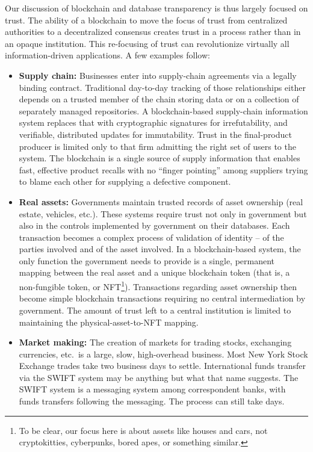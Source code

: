 \documentclass[11pt,dvipdfm]{article}
\begin{document}
Our discussion of blockchain and database transparency is thus largely focused on trust.
The ability of a blockchain to move the focus of trust from centralized authorities to a decentralized
consensus creates trust in a process rather than in an opaque institution.
This re-focusing of trust can revolutionize virtually all information-driven applications.
A few examples follow:
\begin{itemize}
\item {\bf Supply chain: } Businesses enter into supply-chain agreements via a legally binding
contract.  Traditional day-to-day tracking of those relationships either depends on a trusted member of the
chain storing data or on a collection of separately managed  repositories.  A blockchain-based supply-chain
information system replaces that with cryptographic signatures\cite{dh76} for irrefutability,  and verifiable, distributed updates for immutability.
Trust in the final-product producer is limited only to that firm admitting the right set of users to the system.
The blockchain is a single source of supply information that enables fast, effective product recalls with no ``finger pointing'' among
suppliers trying to blame each other for supplying a defective component.
\item {\bf Real assets: } Governments maintain trusted records of asset ownership (real estate, vehicles, etc.).
These systems require trust not only in government but also in the controls implemented by government on
their databases.  Each transaction becomes a complex process of validation of identity -- of the parties involved and
of the asset involved.  In a blockchain-based system, the only function the government needs to provide is a
single, permanent mapping between the real asset and a unique blockchain token (that is, a non-fungible
token, or NFT\footnote{To be clear, our focus here is about assets like houses and cars, not cryptokitties,
cyberpunks,
bored apes, or something similar.}). Transactions regarding asset ownership then become simple blockchain
transactions requiring no central intermediation by government.
The amount of trust left to a central institution is limited to maintaining the physical-asset-to-NFT mapping.
\item {\bf Market making: } The creation of markets for trading stocks, exchanging currencies, etc.\ is a large, slow,
high-overhead business.  Most New York Stock Exchange trades take two business days to settle.
International funds transfer via the SWIFT system may be anything but what that name suggests.  The SWIFT 
system is a messaging system among correspondent banks, with funds transfers following the messaging.
The process can still take days.


\end{itemize}
\end{document}
